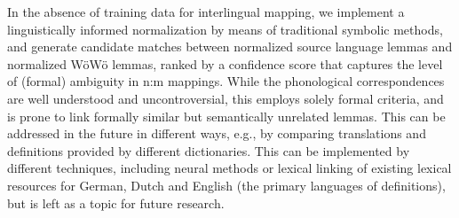 In the absence of training data for interlingual mapping, we implement a linguistically informed normalization by means of traditional symbolic methods, and generate candidate matches between normalized source language lemmas and normalized WöWö lemmas, ranked by a confidence score that captures the level of (formal) ambiguity in n:m mappings. While the phonological correspondences are well understood and uncontroversial, this employs solely formal criteria, and is prone to link formally similar but semantically unrelated lemmas. This can be addressed in the future in different ways, e.g., by comparing translations and definitions provided by different dictionaries. This can be implemented by different techniques, including neural methods or lexical linking of existing lexical resources for German, Dutch and English (the primary languages of definitions), but is left as a topic for future research. 

